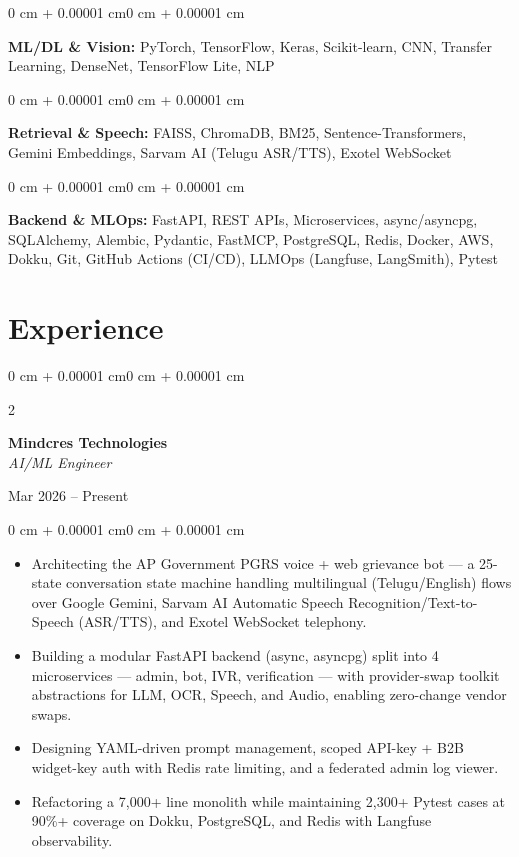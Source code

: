 \documentclass[9pt, letterpaper]{article}
\newenvironment{highlights}{
    \begin{itemize}[
        topsep=0.04 cm,
        parsep=0.04 cm,
        partopsep=0pt,
        itemsep=0pt,
        leftmargin=0 cm + 7pt
    ]
}{
    \end{itemize}
}
\newenvironment{onecolentry}{
    \begin{adjustwidth}{0 cm + 0.00001 cm}{0 cm + 0.00001 cm}
}{
    \end{adjustwidth}
}
\newenvironment{twocolentry}[2][]{
    \onecolentry
    \def\secondColumn{#2}
    \setcolumnwidth{\fill, 4.0 cm}
    \begin{paracol}{2}
}{
    \switchcolumn \raggedleft \secondColumn
    \end{paracol}
    \endonecolentry
}
\begin{document}
\vspace{0.2 cm}

\begin{onecolentry}
    \textbf{ML/DL \& Vision:} PyTorch, TensorFlow, Keras, Scikit-learn, CNN, Transfer Learning, DenseNet, TensorFlow Lite, NLP
\end{onecolentry}

\vspace{0.2 cm}

\begin{onecolentry}
    \textbf{Retrieval \& Speech:} FAISS, ChromaDB, BM25, Sentence-Transformers, Gemini Embeddings, Sarvam AI (Telugu ASR/TTS), Exotel WebSocket
\end{onecolentry}

\vspace{0.2 cm}

\begin{onecolentry}
    \textbf{Backend \& MLOps:} FastAPI, REST APIs, Microservices, async/asyncpg, SQLAlchemy, Alembic, Pydantic, FastMCP, PostgreSQL, Redis, Docker, AWS, Dokku, Git, GitHub Actions (CI/CD), LLMOps (Langfuse, LangSmith), Pytest
\end{onecolentry}

\section{Experience}

\begin{twocolentry}{Mar 2026 -- Present}
    \textbf{Mindcres Technologies} \\
    \textit{AI/ML Engineer}
\end{twocolentry}

\vspace{0.10 cm}

\begin{onecolentry}
    \begin{highlights}
        \item Architecting the AP Government PGRS voice + web grievance bot --- a 25-state conversation state machine handling multilingual (Telugu/English) flows over Google Gemini, Sarvam AI Automatic Speech Recognition/Text-to-Speech (ASR/TTS), and Exotel WebSocket telephony.
        \item Building a modular FastAPI backend (async, asyncpg) split into 4 microservices --- admin, bot, IVR, verification --- with provider-swap toolkit abstractions for LLM, OCR, Speech, and Audio, enabling zero-change vendor swaps.
        \item Designing YAML-driven prompt management, scoped API-key + B2B widget-key auth with Redis rate limiting, and a federated admin log viewer.
        \item Refactoring a 7{,}000+ line monolith while maintaining 2{,}300+ Pytest cases at 90\%+ coverage on Dokku, PostgreSQL, and Redis with Langfuse observability.
    \end{highlights}
\end{onecolentry}
\end{document}
